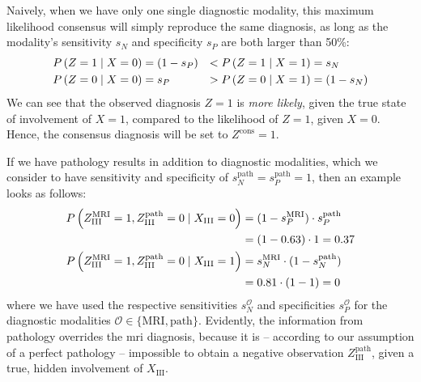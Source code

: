 \documentclass[\relativeRoot/main.tex]{subfiles}
\begin{document}
Naively, when we have only one single diagnostic modality, this maximum likelihood consensus will simply reproduce the same diagnosis, as long as the modality's sensitivity $s_N$ and specificity $s_P$ are both larger than 50\%:
%
\begin{equation}
    \begin{aligned}
        P \left( Z = 1 \mid X = 0 \right) &= \left( 1 - s_P \right) &< P \left( Z = 1 \mid X = 1 \right) &= s_N \\
        P \left( Z = 0 \mid X = 0 \right) &= s_P &> P \left( Z = 0 \mid X = 1 \right) &= \left( 1 - s_N \right)
    \end{aligned}
\end{equation}
%
We can see that the observed diagnosis $Z=1$ is \emph{more likely}, given the true state of involvement of $X=1$, compared to the likelihood of $Z=1$, given $X=0$. Hence, the consensus diagnosis will be set to $Z^\text{cons} = 1$.

If we have pathology results in addition to diagnostic modalities, which we consider to have sensitivity and specificity of $s^\text{path}_N = s^\text{path}_P = 1$, then an example looks as follows:
%
\begin{equation}
    \begin{aligned}
        P \left( Z_\text{III}^\text{MRI} = 1, Z_\text{III}^\text{path} = 0 \mid X_\text{III} = 0 \right)
        &= (1 - s^\text{MRI}_P) \cdot s^\text{path}_P \\
        &= (1 - 0.63) \cdot 1 = 0.37 \\
        P \left( Z_\text{III}^\text{MRI} = 1, Z_\text{III}^\text{path} = 0 \mid X_\text{III} = 1 \right)
        &= s^\text{MRI}_N \cdot (1 - s^\text{path}_N) \\
        &= 0.81 \cdot (1 - 1) = 0
    \end{aligned}
\end{equation}
%
where we have used the respective sensitivities $s_N^\mathcal{O}$ and specificities $s_P^\mathcal{O}$ for the diagnostic modalities $\mathcal{O} \in \{ \text{MRI}, \text{path} \}$. Evidently, the information from pathology overrides the \gls{mri} diagnosis, because it is -- according to our assumption of a perfect pathology -- impossible to obtain a negative observation $Z_\text{III}^\text{path}$, given a true, hidden involvement of $X_\text{III}$.
\end{document}
